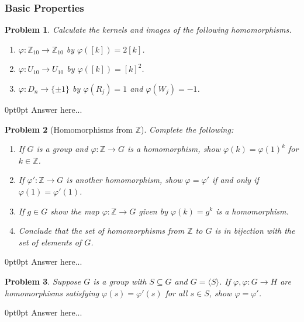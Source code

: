 \documentclass[12pt]{article}
\newcommand{\Z}{\mathbb{Z}}
\newtheorem{problem}{Problem}
\numberwithin{problem}{section} %
\theoremstyle{remark}  %
\newenvironment{answer}
    {\begin{adjustwidth}{0pt}{0pt}}
    {\end{adjustwidth}}
\begin{document}
\subsubsection{Basic Properties}
    \begin{problem}
        Calculate the kernels and images of the following homomorphisms.
        \begin{enumerate}[label=(\alph*)]
            \item $\varphi\operatorname{:} \Z_{10}\to\Z_{10}$ by $\varphi([k]) = 2[k]$.
            \item $\varphi\operatorname{:} U_{10}\to U_{10}$ by $\varphi([k])=[k]^2$.
            \item $\varphi\operatorname{:} D_n \to \{\pm 1\}$ by $\varphi(R_j)=1$ and $\varphi(W_j)=-1$.
        \end{enumerate}
    \end{problem}
    \begin{answer}
        Answer here...
    \end{answer}
\setcounter{problem}{98}
    \begin{problem}[Homomorphisms from $\Z$]
        Complete the following:
        \begin{enumerate}[label=(\alph*)]
            \item If $G$ is a group and $\varphi\operatorname{:} \Z \to G$ is a homomorphism, show $\varphi(k)=\varphi(1)^k$ for $k\in\Z$.
            \item If $\varphi'\operatorname{:}\Z\to G$ is another homomorphism, show $\varphi = \varphi'$ if and only if $\varphi(1)=\varphi'(1)$.
            \item If $g\in G$ show the map $\varphi\operatorname{:}\Z\to G$ given by $\varphi(k)=g^k$ is a homomorphism.
            \item Conclude that the set of homomorphisms from $\Z$ to $G$ is in bijection with the set of elements of $G$.
        \end{enumerate}
    \end{problem}
    \begin{answer}
        Answer here...
    \end{answer}
\setcounter{problem}{103}
    \begin{problem}
        Suppose $G$ is a group with $S\subseteq G$ and $G=\langle S \rangle$. If $\varphi, \varphi \operatorname{:} G \to H$ are homomorphisms satisfying $\varphi(s)=\varphi'(s)$ for all $s\in S$, show $\varphi=\varphi'$.
    \end{problem}
    \begin{answer}
        Answer here...
    \end{answer}
\end{document}
